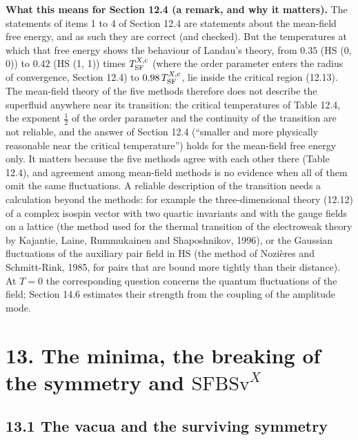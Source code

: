 \documentclass[
  10pt,
]{article}
\begin{document}
\textbf{What this means for Section 12.4 (a remark, and why it
matters).} The statements of items 1 to 4 of Section 12.4 are statements
about the mean-field free energy, and as such they are correct (and
checked). But the temperatures at which that free energy shows the
behaviour of Landau's theory, from \(0.35\) (HS (0, 0)) to \(0.42\) (HS
(1, 1)) times \(T^{X,{\rm c}}_{\rm SF}\) (where the order parameter
enters the radius of convergence, Section 12.4) to
\(0.98\,T^{X,{\rm c}}_{\rm SF}\), lie inside the critical region
(12.13). The mean-field theory of the five methods therefore does not
describe the superfluid anywhere near its transition: the critical
temperatures of Table 12.4, the exponent \(\tfrac12\) of the order
parameter and the continuity of the transition are not reliable, and the
answer of Section 12.4 (``smaller and more physically reasonable near
the critical temperature'') holds for the mean-field free energy only.
It matters because the five methods agree with each other there (Table
12.4), and agreement among mean-field methods is no evidence when all of
them omit the same fluctuations. A reliable description of the
transition needs a calculation beyond the methods: for example the
three-dimensional theory (12.12) of a complex isospin vector with two
quartic invariants and with the gauge fields on a lattice (the method
used for the thermal transition of the electroweak theory by Kajantie,
Laine, Rummukainen and Shaposhnikov, 1996), or the Gaussian fluctuations
of the auxiliary pair field in HS (the method of Nozières and
Schmitt-Rink, 1985, for pairs that are bound more tightly than their
distance). At \(T=0\) the corresponding question concerns the quantum
fluctuations of the field; Section 14.6 estimates their strength from
the coupling of the amplitude mode.

\hypertarget{the-minima-the-breaking-of-the-symmetry-and-mathrmsfbsvx}{%
\section{\texorpdfstring{13. The minima, the breaking of the symmetry
and
\(\mathrm{SFBSv}^X\)}{13. The minima, the breaking of the symmetry and \textbackslash mathrm\{SFBSv\}\^{}X}}\label{the-minima-the-breaking-of-the-symmetry-and-mathrmsfbsvx}}

\hypertarget{the-vacua-and-the-surviving-symmetry}{%
\subsection{13.1 The vacua and the surviving
symmetry}\label{the-vacua-and-the-surviving-symmetry}}
\end{document}
